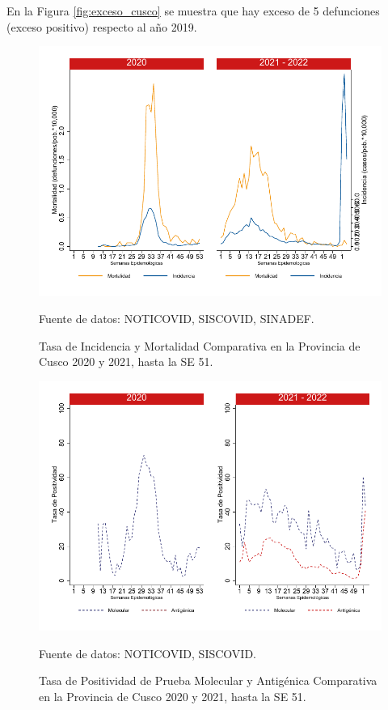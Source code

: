 \documentclass[12pt,a4paper,openany]{book}
\begin{document}
	En la Figura \ref{fig:exceso_cusco} se muestra que hay exceso de 5 defunciones (exceso positivo) respecto al año 2019.
		
		\begin{figure}[h]
			\caption{Tasa de Incidencia y Mortalidad Comparativa en la Provincia de Cusco 2020 y 2021, hasta la SE 51.}\label{fig:inc_mort_cusco}
			\begin{center}
				\includegraphics[width=0.7\linewidth]{../figuras/incidencia_mortalidad_20_21_7}
			\end{center}
			{\footnotesize {Fuente de datos: NOTICOVID, SISCOVID, SINADEF.}}
		\end{figure}
		
		\begin{figure}[h]
			\caption{Tasa de Positividad de Prueba Molecular y Antigénica Comparativa en la Provincia de Cusco 2020 y 2021, hasta la SE 51.}\label{fig:positividad_cusco}
			\begin{center}
				\includegraphics[width=0.7\linewidth]{../figuras/positividad_20_21_7}
			\end{center}
			{\footnotesize {Fuente de datos: NOTICOVID, SISCOVID.}}
		\end{figure}
		
\end{document}
